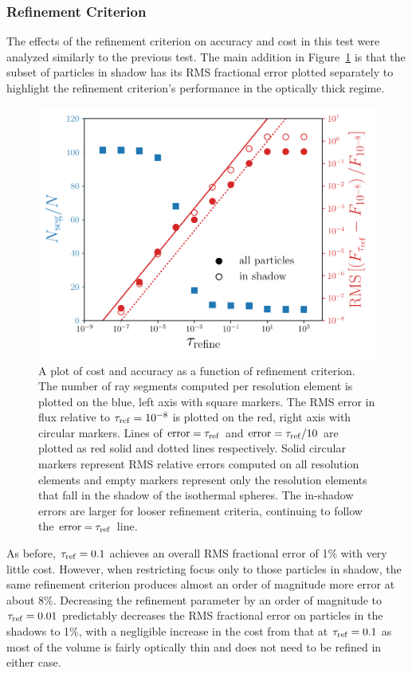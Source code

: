 \documentclass[fleq,usenatbib]{mnras}
\newcommand{\tr}{\tau_{\rm ref}}
\begin{document}
{\subsubsection{Refinement Criterion}
The effects of the refinement criterion on accuracy and cost in this test were 
analyzed similarly to the previous test. The main addition in 
Figure~\ref{fig:isosph} is that the subset of particles in shadow has its RMS 
fractional error plotted separately to highlight the refinement criterion's 
performance in the optically thick regime.
\begin{figure}
\includegraphics[width=1\linewidth]{Figures/isothermal_spheres.pdf}
\caption{A plot of cost and accuracy as a function of refinement criterion. 
The number of ray segments computed per resolution element is plotted on the 
blue, left axis with square markers. The RMS error in flux relative to $\tr
=10^{-8}$ is plotted on the red, right axis with circular markers. Lines of 
${\rm error} = \tr$ and ${\rm error} = \tr/10$ are plotted as red solid and dotted 
lines respectively. Solid circular markers represent RMS relative errors 
computed on all resolution elements and empty markers represent only the 
resolution elements that fall in the shadow of the isothermal spheres. The 
in-shadow errors are larger for looser refinement criteria,
continuing to follow the ${\rm error} = \tr$ line.} 
\label{fig:isosph}
\end{figure}
As before, $\tr=0.1$ achieves an overall RMS fractional error of 1\% with very 
little cost. However, when restricting focus only to those particles in 
shadow, the same refinement criterion produces almost an order of magnitude 
more error at about 8\%. Decreasing the refinement parameter by an order of 
magnitude to $\tr=0.01$ predictably decreases the RMS fractional error on 
particles in the shadows to 1\%, with a negligible increase in the cost from 
that at $\tr=0.1$ as most of the volume is fairly optically thin and does
not need to be refined in either case.

}
\end{document}
